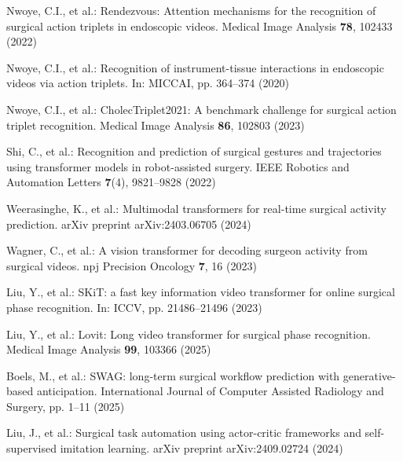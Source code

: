 \documentclass[runningheads]{llncs}
\begin{document}
%
%
%



\begin{thebibliography}{22}
Nwoye, C.I., et al.: Rendezvous: Attention mechanisms for the recognition of surgical action triplets in endoscopic videos. Medical Image Analysis \textbf{78}, 102433 (2022)

Nwoye, C.I., et al.: Recognition of instrument-tissue interactions in endoscopic videos via action triplets. In: MICCAI, pp. 364--374 (2020)

Nwoye, C.I., et al.: CholecTriplet2021: A benchmark challenge for surgical action triplet recognition. Medical Image Analysis \textbf{86}, 102803 (2023)

Shi, C., et al.: Recognition and prediction of surgical gestures and trajectories using transformer models in robot-assisted surgery. IEEE Robotics and Automation Letters \textbf{7}(4), 9821--9828 (2022)

Weerasinghe, K., et al.: Multimodal transformers for real-time surgical activity prediction. arXiv preprint arXiv:2403.06705 (2024)

Wagner, C., et al.: A vision transformer for decoding surgeon activity from surgical videos. npj Precision Oncology \textbf{7}, 16 (2023)

Liu, Y., et al.: SKiT: a fast key information video transformer for online surgical phase recognition. In: ICCV, pp. 21486--21496 (2023)

Liu, Y., et al.: Lovit: Long video transformer for surgical phase recognition. Medical Image Analysis \textbf{99}, 103366 (2025)

Boels, M., et al.: SWAG: long-term surgical workflow prediction with generative-based anticipation. International Journal of Computer Assisted Radiology and Surgery, pp. 1--11 (2025)

Liu, J., et al.: Surgical task automation using actor-critic frameworks and self-supervised imitation learning. arXiv preprint arXiv:2409.02724 (2024)


\end{thebibliography}
\end{document}
